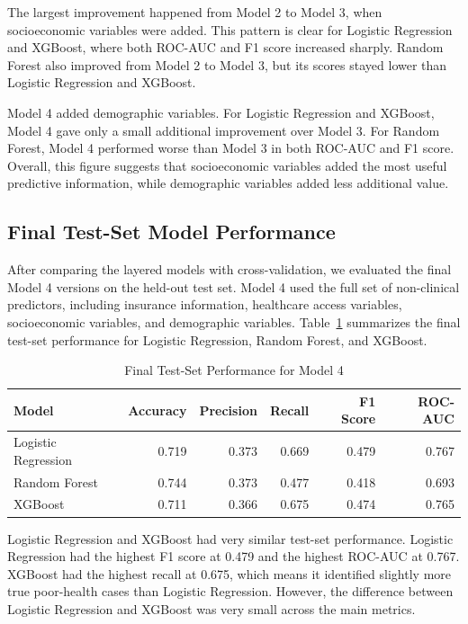 The largest improvement happened from Model 2 to Model 3, when socioeconomic variables were added. This pattern is clear for Logistic Regression and XGBoost, where both ROC-AUC and F1 score increased sharply. Random Forest also improved from Model 2 to Model 3, but its scores stayed lower than Logistic Regression and XGBoost.

Model 4 added demographic variables. For Logistic Regression and XGBoost, Model 4 gave only a small additional improvement over Model 3. For Random Forest, Model 4 performed worse than Model 3 in both ROC-AUC and F1 score. Overall, this figure suggests that socioeconomic variables added the most useful predictive information, while demographic variables added less additional value.

\subsection{Final Test-Set Model Performance}
After comparing the layered models with cross-validation, we evaluated the final Model 4 versions on the held-out test set. Model 4 used the full set of non-clinical predictors, including insurance information, healthcare access variables, socioeconomic variables, and demographic variables. Table~\ref{tab:model4_test_results} summarizes the final test-set performance for Logistic Regression, Random Forest, and XGBoost.

\begin{table}[H]
\centering
\caption{Final Test-Set Performance for Model 4}
\label{tab:model4_test_results}
\begin{tabular}{lrrrrr}
\toprule
Model & Accuracy & Precision & Recall & F1 Score & ROC-AUC \\
\midrule
Logistic Regression & 0.719 & 0.373 & 0.669 & 0.479 & 0.767 \\
Random Forest & 0.744 & 0.373 & 0.477 & 0.418 & 0.693 \\
XGBoost & 0.711 & 0.366 & 0.675 & 0.474 & 0.765 \\
\bottomrule
\end{tabular}
\end{table}

Logistic Regression and XGBoost had very similar test-set performance. Logistic Regression had the highest F1 score at 0.479 and the highest ROC-AUC at 0.767. XGBoost had the highest recall at 0.675, which means it identified slightly more true poor-health cases than Logistic Regression. However, the difference between Logistic Regression and XGBoost was very small across the main metrics.

